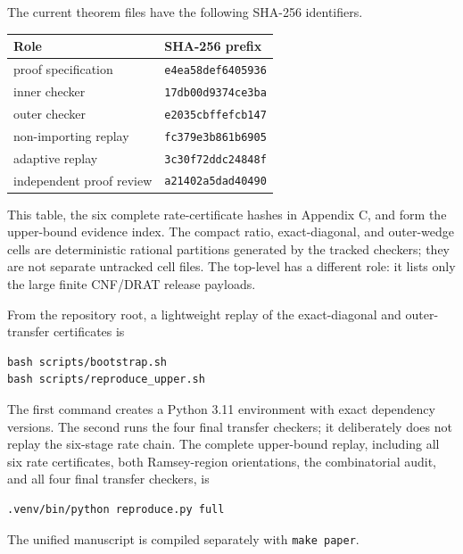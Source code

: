 The current theorem files have the following SHA-256 identifiers.

\begin{center}\small
\begin{tabular}{ll}
\toprule
Role & SHA-256 prefix\\
\midrule
proof specification & \texttt{e4ea58def6405936}\\
inner checker & \texttt{17db00d9374ce3ba}\\
outer checker & \texttt{e2035cbffefcb147}\\
non-importing replay & \texttt{fc379e3b861b6905}\\
adaptive replay & \texttt{3c30f72ddc24848f}\\
independent proof review & \texttt{a21402a5dad40490}\\
\bottomrule
\end{tabular}
\end{center}

This table, the six complete rate-certificate hashes in Appendix C, and
 form the upper-bound evidence index.
The compact ratio, exact-diagonal, and outer-wedge cells are deterministic
rational partitions generated by the tracked checkers; they are not separate
untracked cell files.  The top-level  has a
different role: it lists only the large finite CNF/DRAT release payloads.

From the repository root, a lightweight replay of the exact-diagonal and
outer-transfer certificates is
\begin{verbatim}
bash scripts/bootstrap.sh
bash scripts/reproduce_upper.sh
\end{verbatim}
The first command creates a Python 3.11 environment with exact dependency
versions.  The second runs the four final transfer checkers; it deliberately
does not replay the six-stage rate chain.  The complete upper-bound replay,
including all six rate certificates, both Ramsey-region orientations, the
combinatorial audit, and all four final transfer checkers, is
\begin{verbatim}
.venv/bin/python reproduce.py full
\end{verbatim}
The unified manuscript is compiled separately with
\texttt{make paper}.
